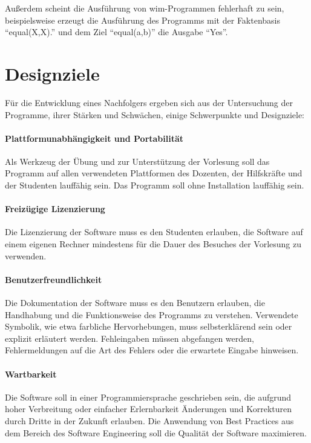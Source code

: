 \documentclass[german, a4paper, parskip, bibliography=totoc]{scrartcl}
\begin{document}
Außerdem scheint die Ausführung von wim-Programmen fehlerhaft zu sein,
beispielsweise erzeugt die Ausführung des Programms mit der Faktenbasis
\enquote{equal(X,X).} und dem Ziel \enquote{equal(a,b)} die Ausgabe
\enquote{Yes}.


\section{Designziele}
Für die Entwicklung eines Nachfolgers ergeben sich aus der Untersuchung der
Programme, ihrer Stärken und Schwächen, einige Schwerpunkte und Designziele:

\paragraph{Plattformunabhängigkeit und Portabilität}
Als Werkzeug der Übung und zur Unterstützung der Vorlesung soll das Programm
auf allen verwendeten Plattformen des Dozenten, der Hilfskräfte und der
Studenten lauffähig sein. Das Programm soll ohne Installation lauffähig sein.

\paragraph{Freizügige Lizenzierung}
Die Lizenzierung der Software muss es den Studenten erlauben, die Software auf
einem eigenen Rechner mindestens für die Dauer des Besuches der Vorlesung zu
verwenden.

\paragraph{Benutzerfreundlichkeit}
Die Dokumentation der Software muss es den Benutzern erlauben, die Handhabung
und die Funktionsweise des Programms zu verstehen. Verwendete Symbolik, wie
etwa farbliche Hervorhebungen, muss selbsterklärend sein oder explizit
erläutert werden. Fehleingaben müssen abgefangen werden, Fehlermeldungen auf
die Art des Fehlers oder die erwartete Eingabe hinweisen.

\paragraph{Wartbarkeit}
Die Software soll in einer Programmiersprache geschrieben sein, die aufgrund
hoher Verbreitung oder einfacher Erlernbarkeit Änderungen und Korrekturen durch
Dritte in der Zukunft erlauben. Die Anwendung von Best Practices aus dem
Bereich des Software Engineering soll die Qualität der Software maximieren.
\end{document}
